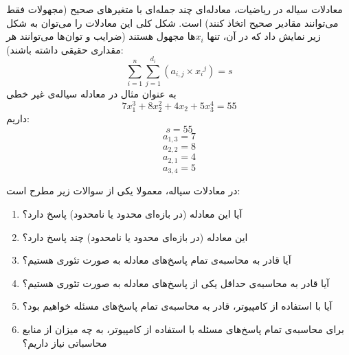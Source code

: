 \begin{EXTRA}{معادلات سیاله}
    \p
    در ریاضیات،
    معادله‌ای چند جمله‌ای با متغیرهای صحیح
    (مجهولات فقط می‌توانند مقادیر صحیح اتخاذ کنند)
    است. شکل کلی این معادلات را می‌توان به شکل زیر نمایش داد
    که در آن، تنها ‌$x_i$ها مجهول هستند
    (ضرایب و توان‌ها می‌توانند هر مقداری حقیقی داشته باشند): 
    $$\sum\limits_{i=1}^{n} \sum\limits_{j=1}^{d_i} ({a_{i,j}} \times {x_i}^{j}) = s$$
    \p
به عنوان مثال در معادله سیاله‌ی غیر خطی 
$$7x_1^3 + 8x_2^2 + 4x_2 + 5x_3^4 = 55$$
داریم:
$$s = 55$$
$$a_{1, 3} = 7$$
$$a_{2, 2} = 8$$
$$a_{2, 1} = 4$$
$$ a_{3, 4} = 5$$

    \p
        در معادلات سیاله، معمولا یکی از سوالات زیر مطرح است:
        \begin{enumerate}
            \item 
            آیا این معادله (در بازه‌ای محدود یا نامحدود) پاسخ دارد؟
            \item 
            این معادله (در بازه‌ای محدود یا نامحدود) چند پاسخ دارد؟
            \item 
            آیا قادر به محاسبه‌ی تمام پاسخ‌های معادله به صورت تئوری هستیم؟
            \item 
            آیا قادر به محاسبه‌ی حداقل یکی از پاسخ‌های معادله به صورت تئوری هستیم؟
            \item 
            آیا با استفاده از کامپیوتر، قادر به محاسبه‌ی تمام پاسخ‌های مسئله خواهیم بود؟
            \item 
            برای محاسبه‌ی تمام پاسخ‌های مسئله با استفاده از کامپیوتر، به چه میزان از منابع محاسباتی نیاز داریم؟
        \end{enumerate}
\end{EXTRA}